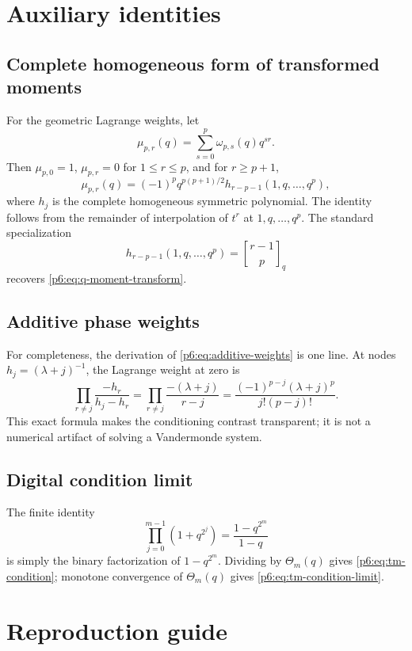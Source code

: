 \documentclass[11pt]{article}
\numberwithin{equation}{section}
\theoremstyle{definition}
\theoremstyle{remark}
\newcommand{\qbinom}[3]{\genfrac{[}{]}{0pt}{}{#1}{#2}_{#3}}
\begin{document}
\appendix
\renewcommand*{\theHsection}{\arabic{part}.\arabic{section}}

\section{Auxiliary identities}
\label{p6:app:identities}

\subsection{Complete homogeneous form of transformed moments}

For the geometric Lagrange weights, let
\[
 \mu_{p,r}(q)=\sum_{s=0}^{p}\omega_{p,s}(q)q^{sr}.
\]
Then $\mu_{p,0}=1$, $\mu_{p,r}=0$ for $1\le r\le p$, and for $r\ge p+1$,
\begin{equation}
 \mu_{p,r}(q)
 =(-1)^pq^{p(p+1)/2}
 h_{r-p-1}(1,q,\ldots,q^p),
 \label{p6:eq:complete-homogeneous-moment}
\end{equation}
where $h_j$ is the complete homogeneous symmetric polynomial.  The identity follows from
the remainder of interpolation of $t^r$ at $1,q,\ldots,q^p$.  The standard specialization
\[
 h_{r-p-1}(1,q,\ldots,q^p)=\qbinom{r-1}{p}{q}
\]
recovers \eqref{p6:eq:q-moment-transform}.

\subsection{Additive phase weights}

For completeness, the derivation of \eqref{p6:eq:additive-weights} is one line.  At nodes
$h_j=(\lambda+j)^{-1}$, the Lagrange weight at zero is
\[
 \prod_{r\ne j}\frac{-h_r}{h_j-h_r}
 =\prod_{r\ne j}\frac{-(\lambda+j)}{r-j}
 =\frac{(-1)^{p-j}(\lambda+j)^p}{j!(p-j)!}.
\]
This exact formula makes the conditioning contrast transparent; it is not a numerical
artifact of solving a Vandermonde system.

\subsection{Digital condition limit}

The finite identity
\[
 \prod_{j=0}^{m-1}(1+q^{2^j})=\frac{1-q^{2^m}}{1-q}
\]
is simply the binary factorization of $1-q^{2^m}$.  Dividing by
$\Theta_m(q)$ gives \eqref{p6:eq:tm-condition}; monotone convergence of
$\Theta_m(q)$ gives \eqref{p6:eq:tm-condition-limit}.

\section{Reproduction guide}
\label{p6:app:reproduction}
\end{document}
